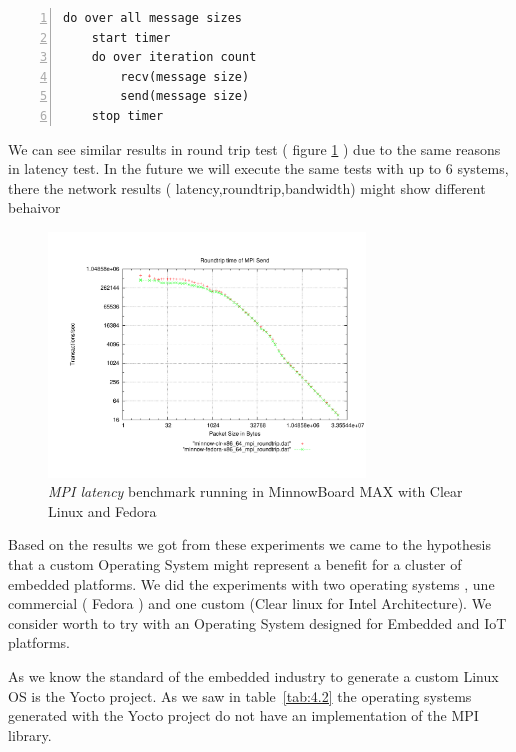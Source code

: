 \begin{minipage}{\textwidth}
\begin{lstlisting}[frame=single,numbers=left]
do over all message sizes 
    start timer
    do over iteration count
        recv(message size)
        send(message size)
    stop timer
\end{lstlisting}

\end{minipage}

We can see similar results in round trip test ( figure
\ref{mpi_roundtrip_clr_fedora} ) due to the same reasons in latency test. In
the future we will execute the same tests with up to 6 systems, there the
network results ( latency,roundtrip,bandwidth) might show different behaivor

\begin{figure}[H]
\centering
\includegraphics[width=0.75\textwidth]{images/mpbench_clr_experiments/mpi_roundtrip.pdf}
\caption{\textit{MPI latency} benchmark running in MinnowBoard MAX with Clear Linux and
Fedora }
\label{mpi_roundtrip_clr_fedora}
\end{figure}

Based on the results we got from these experiments we came to the hypothesis
that a custom Operating System might represent a benefit for a cluster of
embedded platforms. We did the experiments with two operating systems , une
commercial ( Fedora ) and one custom (Clear linux for Intel Architecture). We
consider worth to try with an Operating System designed for Embedded and IoT
platforms. 

As we know the standard of the embedded industry to generate a custom Linux OS
is the Yocto project. As we saw in table~\ref{tab:4.2} the operating systems
generated with the Yocto project do not have an implementation of the MPI
library. 

